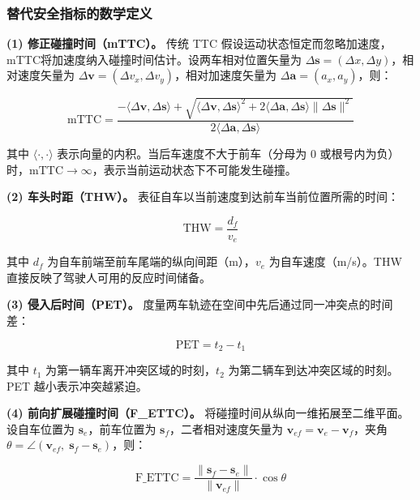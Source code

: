 \documentclass[preprint,review,12pt,a4paper]{elsarticle}
\begin{document}
\subsubsection{替代安全指标的数学定义}

\textbf{(1) 修正碰撞时间（mTTC）。} 传统 TTC 假设运动状态恒定而忽略加速度，mTTC将加速度纳入碰撞时间估计。设两车相对位置矢量为 $\Delta\mathbf{s} = (\Delta x, \Delta y)$，相对速度矢量为 $\Delta\mathbf{v} = (\Delta v_x, \Delta v_y)$，相对加速度矢量为 $\Delta\mathbf{a} = (a_x, a_y)$，则：

\begin{equation}
\text{mTTC} = \frac{-\langle\Delta\mathbf{v}, \Delta\mathbf{s}\rangle + \sqrt{\langle\Delta\mathbf{v}, \Delta\mathbf{s}\rangle^2 + 2\langle\Delta\mathbf{a}, \Delta\mathbf{s}\rangle\|\Delta\mathbf{s}\|^2}}{2\langle\Delta\mathbf{a}, \Delta\mathbf{s}\rangle}
\end{equation}

其中 $\langle\cdot,\cdot\rangle$ 表示向量的内积。当后车速度不大于前车（分母为 0 或根号内为负）时，$\text{mTTC} \to \infty$，表示当前运动状态下不可能发生碰撞。

\textbf{(2) 车头时距（THW）。} 表征自车以当前速度到达前车当前位置所需的时间：

\begin{equation}
\text{THW} = \frac{d_{\!f}}{v_e}
\end{equation}

其中 $d_{\!f}$ 为自车前端至前车尾端的纵向间距（m），$v_e$ 为自车速度（m/s）。THW 直接反映了驾驶人可用的反应时间储备。

\textbf{(3) 侵入后时间（PET）。} 度量两车轨迹在空间中先后通过同一冲突点的时间差\cite{C04}：

\begin{equation}
\text{PET} = t_{2} - t_{1}
\end{equation}

其中 $t_1$ 为第一辆车离开冲突区域的时刻，$t_2$ 为第二辆车到达冲突区域的时刻。PET 越小表示冲突越紧迫。

\textbf{(4) 前向扩展碰撞时间（F\_ETTC）。} 将碰撞时间从纵向一维拓展至二维平面\cite{C03}。设自车位置为 $\mathbf{s}_e$，前车位置为 $\mathbf{s}_f$，二者相对速度矢量为 $\mathbf{v}_{ef} = \mathbf{v}_e - \mathbf{v}_f$，夹角 $\theta = \angle(\mathbf{v}_{ef},\; \mathbf{s}_f - \mathbf{s}_e)$，则：

\begin{equation}
\text{F\_ETTC} = \frac{\|\mathbf{s}_f - \mathbf{s}_e\|}{\|\mathbf{v}_{ef}\|} \cdot \cos\theta
\end{equation}
\end{document}
